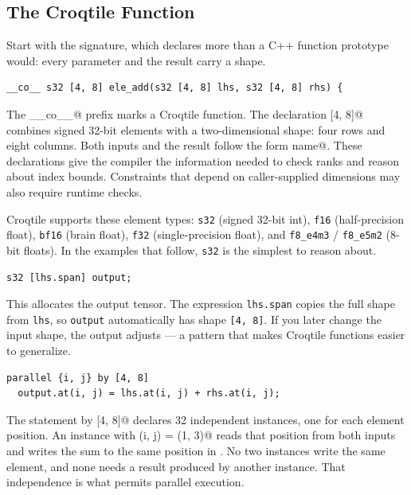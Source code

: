 \subsection*{The Croqtile Function}

Start with the signature, which declares more than a C++ function prototype would: every parameter and the result carry a shape.

\begin{lstlisting}[language=croqtile,caption={A kernel signature (fragment)}]
__co__ s32 [4, 8] ele_add(s32 [4, 8] lhs, s32 [4, 8] rhs) {
\end{lstlisting}

The \co@__co__@ prefix marks a Croqtile function. The declaration  [4, 8]@ combines signed 32-bit elements with a two-dimensional shape: four rows and eight columns. Both inputs and the result follow the form \co@type [shape] name@. These declarations give the compiler the information needed to check ranks and reason about index bounds. Constraints that depend on caller-supplied dimensions may also require runtime checks.

Croqtile supports these element types: \texttt{s32} (signed 32-bit int), \texttt{f16} (half-precision float), \texttt{bf16} (brain float), \texttt{f32} (single-precision float), and \texttt{f8\_e4m3} / \texttt{f8\_e5m2} (8-bit floats). In the examples that follow, \texttt{s32} is the simplest to reason about.

\begin{lstlisting}[language=croqtile,caption={Allocating the output}]
s32 [lhs.span] output;
\end{lstlisting}

This allocates the output tensor. The expression \texttt{lhs.span} copies the full shape from \texttt{lhs}, so \texttt{output} automatically has shape \texttt{[4, 8]}. If you later change the input shape, the output adjusts --- a pattern that makes Croqtile functions easier to generalize.

\begin{lstlisting}[language=croqtile,caption={The parallel body}]
parallel {i, j} by [4, 8]
  output.at(i, j) = lhs.at(i, j) + rhs.at(i, j);
\end{lstlisting}

The statement  by [4, 8]@ declares 32 independent instances, one for each element position. An instance with \co@(i, j) = (1, 3)@ reads that position from both inputs and writes the sum to the same position in \co@output@. No two instances write the same element, and none needs a result produced by another instance. That independence is what permits parallel execution.

